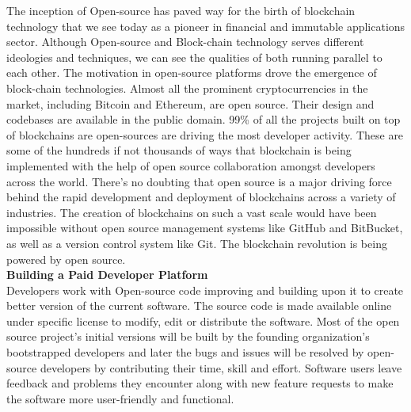 \documentclass[letterpaper,11pt]{article}
\begin{document}
The inception of Open-source has paved way for the birth of blockchain technology that we see today as a pioneer in financial and immutable applications sector. Although Open-source and Block-chain technology serves different ideologies and techniques, we can see the qualities of both running parallel to each other. The motivation in open-source platforms drove the emergence of block-chain technologies. Almost all the prominent cryptocurrencies in the market, including Bitcoin and Ethereum, are open source. Their design and codebases are available in the public domain. 99\% of all the projects built on top of blockchains are open-sources are driving the most developer activity. These are some of the hundreds if not thousands of ways that blockchain is being implemented with the help of open source collaboration amongst developers across the world. There’s no doubting that open source is a major driving force behind the rapid development and deployment of blockchains across a variety of industries. The creation of blockchains on such a vast scale would have been impossible without open source management systems like GitHub and BitBucket, as well as a version control system like Git. The blockchain revolution is being powered by open source.\\

\textbf{Building a Paid Developer Platform}\\

Developers work with Open-source code improving and building upon it to create better version of the current software. The source code is made available online under specific license to modify, edit or distribute the software. Most of the open source project's initial versions will be built by the founding organization's bootstrapped developers and later the bugs and issues will be resolved by open-source developers by contributing their time, skill and effort. Software users leave feedback and problems they encounter along with new feature requests to make the software more user-friendly and functional.\\ 
\end{document}
